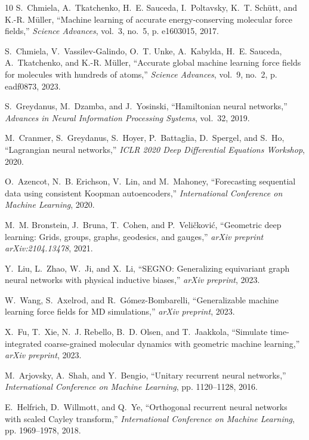 \documentclass{article}
\begin{document}
\begin{thebibliography}{10}
S.~Chmiela, A.~Tkatchenko, H.~E. Sauceda, I.~Poltavsky, K.~T. Sch{\"u}tt, and
  K.-R. M{\"u}ller, ``Machine learning of accurate energy-conserving molecular
  force fields,'' \emph{Science Advances}, vol.~3, no.~5, p. e1603015, 2017.

S.~Chmiela, V.~Vassilev-Galindo, O.~T. Unke, A.~Kabylda, H.~E. Sauceda,
  A.~Tkatchenko, and K.-R. M{\"u}ller, ``Accurate global machine learning force
  fields for molecules with hundreds of atoms,'' \emph{Science Advances},
  vol.~9, no.~2, p. eadf0873, 2023.

S.~Greydanus, M.~Dzamba, and J.~Yosinski, ``Hamiltonian neural networks,''
  \emph{Advances in Neural Information Processing Systems}, vol.~32, 2019.

M.~Cranmer, S.~Greydanus, S.~Hoyer, P.~Battaglia, D.~Spergel, and S.~Ho,
  ``Lagrangian neural networks,'' \emph{ICLR 2020 Deep Differential Equations
  Workshop}, 2020.

O.~Azencot, N.~B. Erichson, V.~Lin, and M.~Mahoney, ``Forecasting sequential
  data using consistent {K}oopman autoencoders,'' \emph{International Conference
  on Machine Learning}, 2020.

M.~M. Bronstein, J.~Bruna, T.~Cohen, and P.~Veli{\v{c}}kovi{\'c}, ``Geometric
  deep learning: Grids, groups, graphs, geodesics, and gauges,'' \emph{arXiv
  preprint arXiv:2104.13478}, 2021.

Y.~Liu, L.~Zhao, W.~Ji, and X.~Li, ``SEGNO: Generalizing equivariant graph
  neural networks with physical inductive biases,'' \emph{arXiv preprint}, 2023.

W.~Wang, S.~Axelrod, and R.~G{\'o}mez-Bombarelli, ``Generalizable machine
  learning force fields for {MD} simulations,'' \emph{arXiv preprint}, 2023.

X.~Fu, T.~Xie, N.~J. Rebello, B.~D. Olsen, and T.~Jaakkola, ``Simulate
  time-integrated coarse-grained molecular dynamics with geometric machine
  learning,'' \emph{arXiv preprint}, 2023.

M.~Arjovsky, A.~Shah, and Y.~Bengio, ``Unitary recurrent neural networks,'' \emph{International Conference on Machine Learning}, pp. 1120--1128, 2016.

E.~Helfrich, D.~Willmott, and Q.~Ye, ``Orthogonal recurrent neural networks with scaled {C}ayley transform,'' \emph{International Conference on Machine Learning}, pp. 1969--1978, 2018.

\end{thebibliography}
\end{document}
